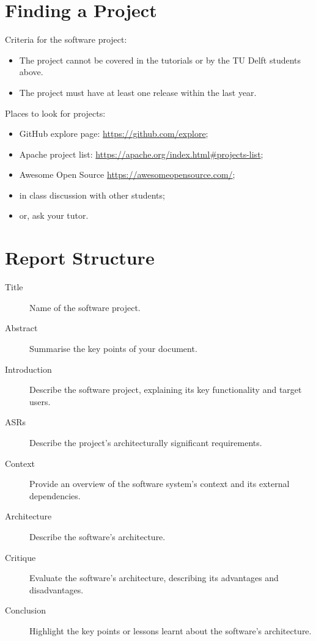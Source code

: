 \documentclass{csse4400}
\begin{document}
\section{Finding a Project}
Criteria for the software project:
\begin{itemize}
    \item The project cannot be covered in the tutorials or by the TU Delft students above.
    \item The project must have at least one release within the last year.
\end{itemize}

\noindent%
 Places to look for projects:
\begin{itemize}
    \item GitHub explore page: \url{https://github.com/explore};
    \item Apache project list: \url{https://apache.org/index.html#projects-list};
    \item Awesome Open Source \url{https://awesomeopensource.com/};
    \item in class discussion with other students;
    \item or, ask your tutor.
\end{itemize}


\section{Report Structure}

\begin{description}
    \item[Title] Name of the software project.
    \item[Abstract] Summarise the key points of your document.
    \item[Introduction] Describe the software project, explaining its key functionality and target users.
    \item[ASRs] Describe the project's architecturally significant requirements.
    \item[Context] Provide an overview of the software system's context and its external dependencies.
    \item[Architecture] Describe the software's architecture.
    \item[Critique] Evaluate the software's architecture, describing its advantages and disadvantages.
    \item[Conclusion] Highlight the key points or lessons learnt about the software's architecture.
\end{description}
\end{document}
